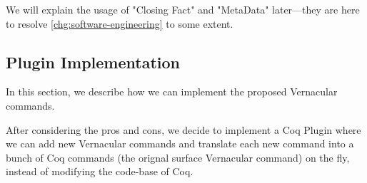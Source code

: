 
We will explain the usage of "Closing Fact" and "MetaData" later---they are here to resolve \ref{chg:software-engineering} to some extent.

\subsection{Plugin Implementation}

In this section, we describe how we can implement the proposed Vernacular commands.

After considering the pros and cons, we decide to implement a Coq Plugin where we can add new Vernacular commands and translate each new command into a bunch of Coq commands (the orignal surface Vernacular command) on the fly, instead of modifying the code-base of Coq. 

